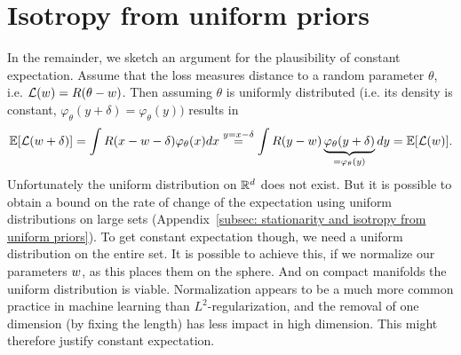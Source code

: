 \section{Isotropy from uniform priors}

In the remainder, we sketch an argument for the plausibility of constant
expectation. Assume that the loss measures distance to a random
parameter \(\theta\), i.e.  \(\mathcal{L}(w) = R(\theta - w)\).
Then assuming \(\theta\) is uniformly distributed (i.e. its density is constant,
\(\varphi_\theta(y+\delta) = \varphi_\theta(y))\) results in 
\[
	\mathbb{E}[\mathcal{L}(w + \delta)]
	= \int R(x - w - \delta) \varphi_{\theta}(x) dx
	\overset{y=x-\delta}= \int R(y - w)
	\underbrace{\varphi_{\theta}(y + \delta)}_{=\varphi_\theta(y)} dy
	= \mathbb{E}[\mathcal{L}(w)].
\]
Unfortunately the uniform distribution on \(\mathbb{R}^d\) does not exist.
But it is possible to obtain a bound on the rate of change of the expectation
using uniform distributions on large sets (Appendix~\ref{subsec:
stationarity and isotropy from uniform priors}).
To get constant expectation though, we need a uniform distribution on the entire
set. It is possible to achieve this, if we normalize our parameters \(w\),
as this places them on the sphere. And on compact manifolds the uniform
distribution is viable. Normalization appears to be a much more common practice
in machine learning than \(L^2\)-regularization, and the removal of one
dimension (by fixing the length) has less impact in high dimension. This might
therefore justify constant expectation.
